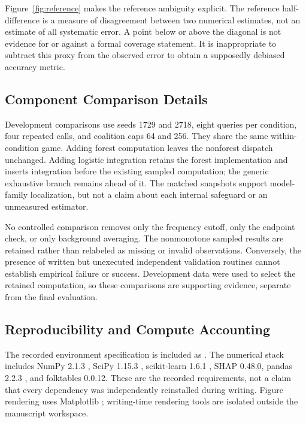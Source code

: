 \documentclass{article}
\begin{document}
Figure~\ref{fig:reference} makes the reference ambiguity explicit. The reference half-difference is a measure of disagreement between two numerical estimates, not an estimate of all systematic error. A point below or above the diagonal is not evidence for or against a formal coverage statement. It is inappropriate to subtract this proxy from the observed error to obtain a supposedly debiased accuracy metric.

\subsection{Component Comparison Details}
Development comparisons use seeds 1729 and 2718, eight queries per condition, four repeated calls, and coalition caps 64 and 256. They share the same within-condition game. Adding forest computation leaves the nonforest dispatch unchanged. Adding logistic integration retains the forest implementation and inserts integration before the existing sampled computation; the generic exhaustive branch remains ahead of it. The matched snapshots support model-family localization, but not a claim about each internal safeguard or an unmeasured estimator.

No controlled comparison removes only the frequency cutoff, only the endpoint check, or only background averaging. The nonmonotone sampled results are retained rather than relabeled as missing or invalid observations. Conversely, the presence of written but unexecuted independent validation routines cannot establish empirical failure or success. Development data were used to select the retained computation, so these comparisons are supporting evidence, separate from the final evaluation.

\subsection{Reproducibility and Compute Accounting}
The recorded environment specification is included as
. The numerical stack includes NumPy 2.1.3 \citep{Harris2020}, SciPy 1.15.3 \citep{Virtanen2020}, scikit-learn 1.6.1 \citep{Pedregosa2011}, SHAP 0.48.0, pandas 2.2.3 \citep{McKinney2010}, and folktables 0.0.12. These are the recorded requirements, not a claim that every dependency was independently reinstalled during writing. Figure rendering uses Matplotlib \citep{Hunter2007}; writing-time rendering tools are isolated outside the manuscript workspace.
\end{document}
